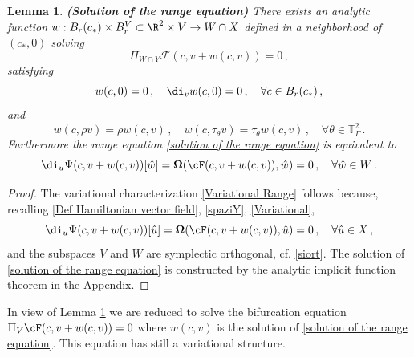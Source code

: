\documentclass[11pt,a4paper,reqno]{article}
\numberwithin{equation}{section}
\newtheorem{lemma}[theorem]{Lemma}
\theoremstyle{definition}
\begin{document}
\begin{lemma}\label{lem:range}
{\bf (Solution of the range equation)}
    There exists  an analytic function $w:B_{r}(c_*)\times B_{r}^V  \subset \R^2\times V\to W\cap X$
    defined in a neighborhood of $ (c_*,0) $ solving 
\begin{equation}\label{solution of the range equation}
        \Pi_{W\cap Y}
        {\mathcal F} (c, v+w(c,v)) = 0 \, , 
    \end{equation}
satisfying
\begin{equation}\label{properties of w(c,v)}
        w(c,0)=0\, , \quad \di_v w(c,0)=0 \, , \quad \forall c\in B_{r}(c_*) \, , 
    \end{equation}
and  
\begin{equation}\label{wequi}
w(c,\rho v)=\rho w(c, v) \, , \quad
   w(c, \tau_\theta v)=\tau_\theta 
   w(c,v) \, ,   
   \quad \forall 
   \theta \in\mathbb{T}^2_\Gamma \, .  
\end{equation} 
   Furthermore  
the range equation \eqref{solution of the range equation} is equivalent to
\begin{equation}\label{Variational Range}
    \di_u\Psi(c,v+w(c,v))[\hat w]=\boldsymbol{\Omega}(\cF(c,v+w(c,v)),\hat w)=0 \, , \quad \forall \hat w\in W\, .
\end{equation}
    \end{lemma}
    
\begin{proof}
The variational characterization 
\eqref{Variational Range} follows because, recalling  \eqref{Def Hamiltonian vector field}, \eqref{spaziY}, \eqref{Variational}, 
\begin{equation}\label{Variational Range0}
    \di_u\Psi(c,v+w(c,v))[\hat u]=\boldsymbol{\Omega}(\cF(c,v+w(c,v)),\hat u)=0 \, , \quad \forall \hat u\in X \, ,
\end{equation}
and the subspaces 
$ V $ and $ W $ are symplectic orthogonal, cf. \eqref{siort}. The solution of
\eqref{solution of the range equation} 
is constructed by  the analytic implicit function theorem in the Appendix.
   \end{proof}

In view of   Lemma  \ref{lem:range} 
we are reduced to 
solve the bifurcation equation
$    \Pi_V \cF (c,v+w(c,v)) = 0 $ 
where $ w(c,v)$ is the solution of \eqref{solution of the range equation}.  
This equation has still a
variational structure. 
\end{document}

